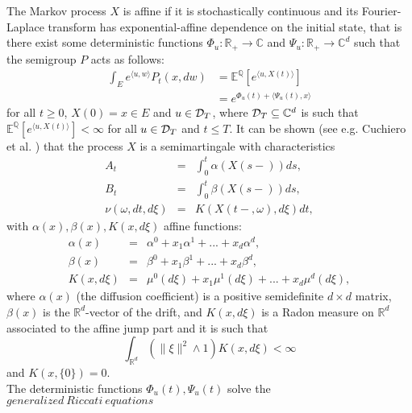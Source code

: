 \documentclass[12pt,a4paper]{article}
\renewcommand{\cite}{\citeyear}
\theoremstyle{plain}
\numberwithin{equation}{section}
\begin{document}
 The Markov process $X$ is affine if it is stochastically continuous and its Fourier-Laplace transform has exponential-affine dependence on the initial state, that is there exist
some deterministic functions $\Phi_u:\mathbb{R}_+\rightarrow \mathbb{C}$ and $\Psi_u:\mathbb{R}_+\rightarrow \mathbb{C}^d$ such that  the semigroup $P$ acts as follows:
\begin{align}
\int_E e^{\langle u ,w \rangle} P_t(x,dw) &
= \mathbb{E}^{\mathbb{Q}}\left[e^{\langle u,X(t)\rangle}  \right]\\
&= e^{\Phi_u(t)+\langle\Psi_u(t) ,x\rangle}
\label{affineeq}
\end{align}
for all $t\geq0$, $X(0)=x\in E$ and $u\in {\cal D}_T$, where ${\cal D}_T\subseteq \mathbb{C}^d$ is such that $\mathbb{E}^{\mathbb{Q}}\left[e^{\langle u,X(t)\rangle}  \right]<\infty$ for all $u\in{\cal D}_T$ and $t\leq T$.
It can be shown (see e.g. Cuchiero et al. \cite{CuchieroEtAl2011}) that the process $X$ is a semimartingale with characteristics
\begin{eqnarray*}
A_t&=& \int_0^t \alpha(X({s-}))ds,\\
B_t&=&\int_0^t \beta(X({s-}))ds,\\
\nu (\omega,dt,d\xi ) &=& K(X({t-},\omega),d\xi)dt,
\end{eqnarray*}
with $\alpha(x),\beta(x),K(x,d\xi)$ affine functions:
\begin{eqnarray*}
\alpha(x)&=&\alpha^0+ x_1 \alpha^1+...+x_d \alpha^d,\\
\beta(x)&=&\beta^0+ x_1 \beta^1+...+x_d \beta^d,\\
K(x,d\xi)&=&\mu^0(d\xi)+x_1 \mu^1 (d\xi)+...+x_d \mu^d(d\xi),
\end{eqnarray*}
where $\alpha(x)$ (the diffusion coefficient) is a positive semidefinite $d\times d$ matrix, $\beta(x)$ is the $\mathbb{R}^d$-vector of the drift, and $K(x,d\xi)$ is a Radon measure on $\mathbb{R}^d$ associated to the affine jump part and it is such that
\begin{equation*}
\int_{\mathbb{R}^d} \left( \lVert \xi \rVert ^2 \wedge 1\right)K(x,d\xi) < \infty
\end{equation*}
and $K(x, \{ 0\})=0$.\\

The deterministic functions $\Phi_u(t),\Psi_u(t)$ solve the $generalized\ Riccati\ equations$
\end{document}
